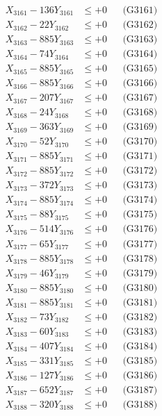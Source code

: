 \documentclass[a4paper,10pt]{article}
\begin{document}
{\begin{align}
\allowbreak
X_{3161} - 136Y_{3161} &\leq +0 && \text{(G3161)} \\
X_{3162} - 22Y_{3162} &\leq +0 && \text{(G3162)} \\
X_{3163} - 885Y_{3163} &\leq +0 && \text{(G3163)} \\
X_{3164} - 74Y_{3164} &\leq +0 && \text{(G3164)} \\
X_{3165} - 885Y_{3165} &\leq +0 && \text{(G3165)} \\
X_{3166} - 885Y_{3166} &\leq +0 && \text{(G3166)} \\
X_{3167} - 207Y_{3167} &\leq +0 && \text{(G3167)} \\
X_{3168} - 24Y_{3168} &\leq +0 && \text{(G3168)} \\
X_{3169} - 363Y_{3169} &\leq +0 && \text{(G3169)} \\
X_{3170} - 52Y_{3170} &\leq +0 && \text{(G3170)} \\
\allowbreak
X_{3171} - 885Y_{3171} &\leq +0 && \text{(G3171)} \\
X_{3172} - 885Y_{3172} &\leq +0 && \text{(G3172)} \\
X_{3173} - 372Y_{3173} &\leq +0 && \text{(G3173)} \\
X_{3174} - 885Y_{3174} &\leq +0 && \text{(G3174)} \\
X_{3175} - 88Y_{3175} &\leq +0 && \text{(G3175)} \\
X_{3176} - 514Y_{3176} &\leq +0 && \text{(G3176)} \\
X_{3177} - 65Y_{3177} &\leq +0 && \text{(G3177)} \\
X_{3178} - 885Y_{3178} &\leq +0 && \text{(G3178)} \\
X_{3179} - 46Y_{3179} &\leq +0 && \text{(G3179)} \\
X_{3180} - 885Y_{3180} &\leq +0 && \text{(G3180)} \\
\allowbreak
X_{3181} - 885Y_{3181} &\leq +0 && \text{(G3181)} \\
X_{3182} - 73Y_{3182} &\leq +0 && \text{(G3182)} \\
X_{3183} - 60Y_{3183} &\leq +0 && \text{(G3183)} \\
X_{3184} - 407Y_{3184} &\leq +0 && \text{(G3184)} \\
X_{3185} - 331Y_{3185} &\leq +0 && \text{(G3185)} \\
X_{3186} - 127Y_{3186} &\leq +0 && \text{(G3186)} \\
X_{3187} - 652Y_{3187} &\leq +0 && \text{(G3187)} \\
X_{3188} - 320Y_{3188} &\leq +0 && \text{(G3188)} \\

\end{align}}
\end{document}
